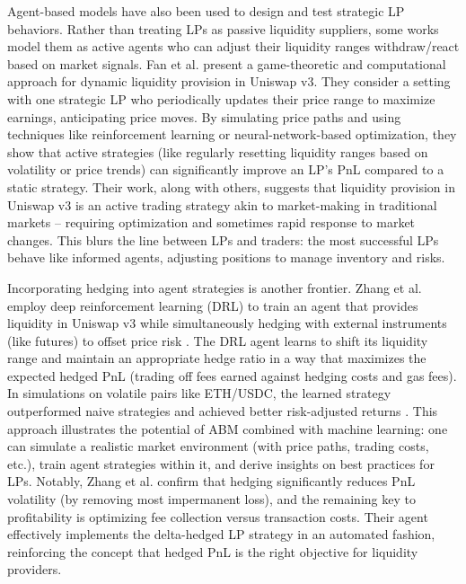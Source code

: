 \documentclass[11pt]{article}
\begin{document}
Agent-based models have also been used to design and test strategic LP behaviors. Rather than treating LPs 
as passive liquidity suppliers, some works model them as active agents who can adjust their liquidity ranges 
withdraw/react based on market signals. Fan et al. \cite{fan2023} present a game-theoretic and computational 
approach for dynamic liquidity provision in Uniswap v3. They consider a setting with one strategic LP who 
periodically updates their price range to maximize earnings, anticipating price moves. By simulating price paths and using techniques like reinforcement learning or neural-network-based optimization, they show that active strategies (like regularly resetting liquidity ranges based on volatility or price trends) can significantly improve an LP’s PnL compared to a static strategy. Their work, along with others, suggests that liquidity provision in Uniswap v3 is an active trading strategy akin to market-making in traditional markets – requiring optimization and sometimes rapid response to market changes. This blurs the line between LPs and traders: the most successful LPs behave like informed agents, adjusting positions to manage inventory and risks.

Incorporating hedging into agent strategies is another frontier. Zhang et al. \cite{zhang2023} employ deep 
reinforcement learning (DRL) to train an agent that provides liquidity in Uniswap v3 while simultaneously 
hedging with external instruments (like futures) to offset price risk . The DRL agent learns to shift its 
liquidity range and maintain an appropriate hedge ratio in a way that maximizes the expected hedged PnL 
(trading off fees earned against hedging costs and gas fees). In simulations on volatile pairs like ETH/USDC, 
the learned strategy outperformed naive strategies and achieved better risk-adjusted returns \cite{zhang2023}. 
This approach illustrates the potential of ABM combined with machine learning: one can simulate a realistic 
market environment (with price paths, trading costs, etc.), train agent strategies within it, and derive 
insights on best practices for LPs. Notably, Zhang et al. confirm that hedging significantly reduces PnL 
volatility (by removing most impermanent loss), and the remaining key to profitability is optimizing fee 
collection versus transaction costs. Their agent effectively implements the delta-hedged LP strategy in an 
automated fashion, reinforcing the concept that hedged PnL is the right objective for liquidity providers.
\end{document}
